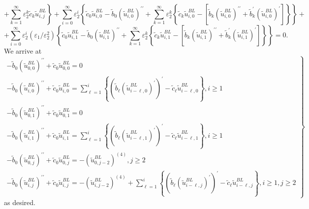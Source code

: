 \documentclass[12pt]{article}
\begin{document}
%
\begin{equation*}
+\left. \sum_{k=1}^{\infty }\varepsilon _{2}^{k}\tilde{c}_{k}\tilde{u}^{BL}%
_{i,j} \right\}+\sum_{i=0}^{\infty }\varepsilon _{2}^{i}\left\{ \tilde{c}_{0}\tilde{u}^{BL}%
_{i,0}-\tilde{b}_{0}\left(\tilde{u}^{BL}_{i,0}\right)^{\prime \prime }+\sum_{k=1}^{\infty
}\varepsilon _{2}^{k}\left\{ \tilde{c}_{k}\tilde{u}^{BL}_{i,0}-\left[ \tilde{b}%
_{k}\left(\tilde{u}^{BL}_{i,0}\right)^{\prime \prime }+\tilde{b}_{k}^{\prime }\left(\tilde{u}^{BL}%
_{i,0}\right)^{\prime }\right] \right\} \right\} +
\end{equation*}
%
\begin{equation*}
+\sum_{i=0}^{\infty }\varepsilon _{2}^{i}(\varepsilon _{1}/\varepsilon
_{2}^{2})\left\{ \tilde{c}_{0}\tilde{u}^{BL}_{i,1}-\tilde{b}_{0}\left(\tilde{u}^{BL}%
_{i,1}\right)^{\prime \prime }+\sum_{k=1}^{\infty }\varepsilon _{2}^{k}\left\{ 
\tilde{c}_{k}\tilde{u}^{BL}_{i,1}-\left[ \tilde{b}_{k}\left(\tilde{u}^{BL}_{i,1}\right)^{\prime
\prime }+\tilde{b}_{k}^{\prime }\left(\tilde{u}^{BL}_{i,1}\right)^{\prime }\right] \right\}
\right\} =0.
\end{equation*}
%
We arrive at
%
\begin{equation*}
\left. 
\begin{array}{c}
-\tilde{b}_{0}\left(\tilde{u}^{BL}_{0,0}\right)^{\prime \prime }+\tilde{c}_{0}\tilde{u}^{BL}_{0,0}=0 \\
-\tilde{b}_{0}\left(\tilde{u}^{BL}_{i,0}\right)^{\prime \prime }+\tilde{c}_{0}\tilde{u}^{BL}_{i,0}=%
\sum_{\ell =1}^{i}\left\{ \left( \tilde{b}_{\ell }%
\left(\tilde{u}^{BL}_{i-\ell ,0}\right)^{\prime }\right) ^{\prime }-\tilde{c}_{\ell }\tilde{u}^{BL}%
_{i-\ell ,0}\right\} ,i\geq 1 \\
-\tilde{b}_{0}\left(\tilde{u}^{BL}_{0,1}\right)^{\prime \prime }+\tilde{c}_{0}\tilde{u%
}^{BL}_{0,1}=0 \\
-\tilde{b}_{0}\left(\tilde{u}^{BL}_{i,1}\right)^{\prime \prime }+\tilde{c}_{0}\tilde{u}^{BL}_{i,1}=%
\sum_{\ell =1}^{i}\left\{ \left( \tilde{b}_{\ell }%
\left(\tilde{u}^{BL}_{i-\ell ,1}\right)^{\prime }\right) ^{\prime }-\tilde{c}_{\ell }\tilde{u}^{BL}%
_{i-\ell ,1}\right\} ,i\geq 1 \\
-\tilde{b}_{0}\left(\tilde{u}^{BL}_{0,j}\right)^{\prime \prime }+\tilde{c}_{0}\tilde{u}^{BL}_{0,j}=-%
\left(\tilde{u}^{BL}_{0,j-2}\right)^{(4)},j\geq 2 \\
-\tilde{b}_{0}\left(\tilde{u}^{BL}_{i,j}\right)^{\prime \prime }+\tilde{c}_{0}\tilde{u}^{BL}_{i,j}=-%
\left(\tilde{u}^{BL}_{i,j-2}\right)^{(4)}+\sum_{\ell =1}^{i}\left\{ \left( \tilde{b}_{\ell }%
\left(\tilde{u}^{BL}_{i-\ell ,j}\right)^{\prime }\right) ^{\prime }-\tilde{c}_{\ell }\tilde{u}^{BL}%
_{i-\ell ,j}\right\} ,i\geq 1,j\geq 2%
\end{array}%
\right\}
\end{equation*}
%
as desired.
\end{document}
